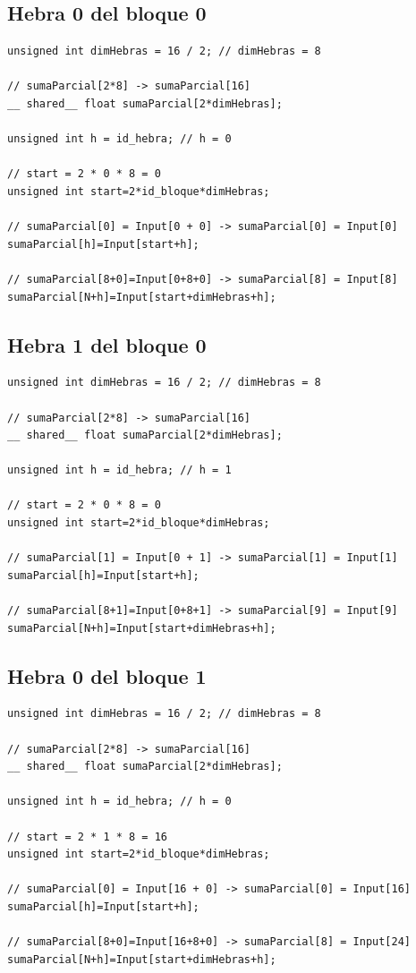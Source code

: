 \documentclass[11pt,a4paper]{article}
\begin{document}
\subsection{Hebra 0 del bloque 0}

\begin{lstlisting}
unsigned int dimHebras = 16 / 2; // dimHebras = 8

// sumaParcial[2*8] -> sumaParcial[16]
__ shared__ float sumaParcial[2*dimHebras];

unsigned int h = id_hebra; // h = 0

// start = 2 * 0 * 8 = 0
unsigned int start=2*id_bloque*dimHebras;

// sumaParcial[0] = Input[0 + 0] -> sumaParcial[0] = Input[0]
sumaParcial[h]=Input[start+h];

// sumaParcial[8+0]=Input[0+8+0] -> sumaParcial[8] = Input[8]
sumaParcial[N+h]=Input[start+dimHebras+h];
\end{lstlisting}

\subsection{Hebra 1 del bloque 0}

\begin{lstlisting}
unsigned int dimHebras = 16 / 2; // dimHebras = 8

// sumaParcial[2*8] -> sumaParcial[16]
__ shared__ float sumaParcial[2*dimHebras];

unsigned int h = id_hebra; // h = 1

// start = 2 * 0 * 8 = 0
unsigned int start=2*id_bloque*dimHebras;

// sumaParcial[1] = Input[0 + 1] -> sumaParcial[1] = Input[1]
sumaParcial[h]=Input[start+h];

// sumaParcial[8+1]=Input[0+8+1] -> sumaParcial[9] = Input[9]
sumaParcial[N+h]=Input[start+dimHebras+h];
\end{lstlisting}

\subsection{Hebra 0 del bloque 1}

\begin{lstlisting}
unsigned int dimHebras = 16 / 2; // dimHebras = 8

// sumaParcial[2*8] -> sumaParcial[16]
__ shared__ float sumaParcial[2*dimHebras];

unsigned int h = id_hebra; // h = 0

// start = 2 * 1 * 8 = 16
unsigned int start=2*id_bloque*dimHebras;

// sumaParcial[0] = Input[16 + 0] -> sumaParcial[0] = Input[16]
sumaParcial[h]=Input[start+h];

// sumaParcial[8+0]=Input[16+8+0] -> sumaParcial[8] = Input[24]
sumaParcial[N+h]=Input[start+dimHebras+h];
\end{lstlisting}
\end{document}
